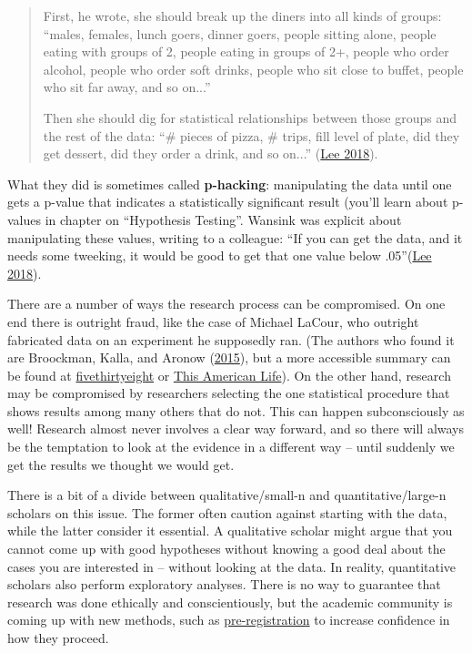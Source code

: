 \documentclass{book}
\begin{document}
\begin{quote}
First, he wrote, she should break up the diners into all kinds of groups:
``males, females, lunch goers, dinner goers, people sitting alone, people
eating with groups of 2, people eating in groups of 2+, people who order
alcohol, people who order soft drinks, people who sit close to buffet, people
who sit far away, and so on...''

Then she should dig for statistical relationships between those groups and the
rest of the data: ``\# pieces of pizza, \# trips, fill level of plate, did
they get dessert, did they order a drink, and so on...''
(\protect\hyperlink{ref-leeSlicedDicedStory2018}{Lee 2018}).
\end{quote}

What they did is sometimes called \textbf{p-hacking}: manipulating the data
until one gets a p-value that indicates a statistically significant result
(you'll learn about p-values in chapter on ``Hypothesis Testing''. Wansink was
explicit about manipulating these values, writing to a colleague: ``If you can
get the data, and it needs some tweeking, it would be good to get that one
value below .05''(\protect\hyperlink{ref-leeSlicedDicedStory2018}{Lee 2018}).

There are a number of ways the research process can be compromised. On one end
there is outright fraud, like the case of Michael LaCour, who outright
fabricated data on an experiment he supposedly ran. (The authors who found it
are Broockman, Kalla, and Aronow
(\protect\hyperlink{ref-broockmanIrregularitiesLaCour20142015}{2015}), but a
more accessible summary can be found at
\href{https://fivethirtyeight.com/features/how-two-grad-students-uncovered-michael-lacour-fraud-and-a-way-to-change-opinions-on-transgender-rights/}{fivethirtyeight}
or
\href{https://www.thisamericanlife.org/extras/canvassers-study-in-episode-555-has-been-retracted}{This
American Life}). On the other hand, research may be compromised by researchers
selecting the one statistical procedure that shows results among many others
that do not. This can happen subconsciously as well! Research almost never
involves a clear way forward, and so there will always be the temptation to
look at the evidence in a different way -- until suddenly we get the results
we thought we would get.

There is a bit of a divide between qualitative/small-n and
quantitative/large-n scholars on this issue. The former often caution against
starting with the data, while the latter consider it essential. A qualitative
scholar might argue that you cannot come up with good hypotheses without
knowing a good deal about the cases you are interested in -- without looking
at the data. In reality, quantitative scholars also perform exploratory
analyses. There is no way to guarantee that research was done ethically and
conscientiously, but the academic community is coming up with new methods,
such as \href{https://cos.io/prereg/}{pre-registration} to increase confidence
in how they proceed.
\end{document}
